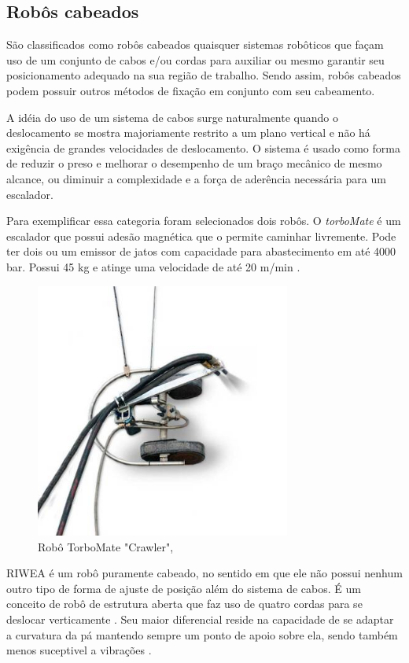 \subsection{Robôs cabeados}
São classificados como robôs cabeados quaisquer sistemas robôticos que façam
uso de um conjunto de cabos e/ou cordas para auxiliar ou mesmo garantir seu
posicionamento adequado na sua região de trabalho. Sendo assim, robôs cabeados
podem possuir outros métodos de fixação em conjunto com seu cabeamento.

A idéia do uso de um sistema de cabos surge naturalmente quando o deslocamento
se mostra majoriamente restrito a um plano vertical e não há exigência de
grandes velocidades de deslocamento. O sistema é usado como forma de reduzir o
preso e melhorar o desempenho de um braço mecânico de mesmo alcance, ou diminuir a complexidade e
a força de aderência necessária para um escalador.

Para exemplificar essa categoria foram selecionados dois robôs. O
\textit{torboMate} é um escalador que possui adesão magnética que o
permite caminhar livremente. Pode ter dois ou um
emissor de jatos com capacidade para abastecimento em até 4000 bar. Possui 45 kg
e atinge uma velocidade de até 20 m/min \citep{torbo}.

\begin{figure}[ht]
	\centering
	\includegraphics[width=8.4cm]{figs/cables/torbo}
	\caption{Robô TorboMate "Crawler", \cite{torbo}}
	\label{fig:cables:torbo}
\end{figure}

RIWEA é um robô puramente cabeado, no sentido em que ele não possui nenhum
outro tipo de forma de ajuste de posição além do sistema de cabos. É um
conceito de robô de estrutura aberta que faz uso de quatro cordas para se
deslocar verticamente \citep{jeon2012maintenance}. Seu maior diferencial reside
na capacidade de se adaptar a curvatura da pá mantendo sempre um ponto de apoio
sobre ela, sendo também menos suceptivel a vibrações \citep{riwea}.


